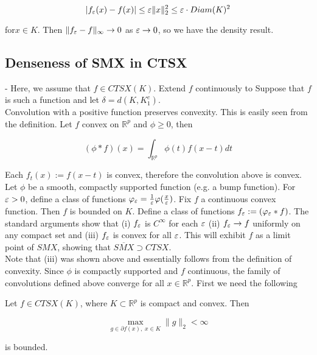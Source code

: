 \documentclass[11pt,reqno]{amsart}
\numberwithin{equation}{section}
\newcommand{\mr}{\mathbb{R}}
\newcommand{\pa}{\partial}
\begin{document}
\[
|f_{\varepsilon}(x) - f(x)| \leq \varepsilon \|x\|_2^2 \leq \varepsilon \cdot Diam(K)^2
\]

for$x \in K$. Then $\|f_{\varepsilon} - f\|_{\infty} \rightarrow 0$ as $\varepsilon \rightarrow 0$, so we have the density result. 

\subsection{Denseness of SMX in CTSX} - Here, we assume that $f \in CTSX(K)$. Extend $f$ continuously to Suppose that $f$ is such a function and let $\delta = d(K, K_1^c)$. \\

Convolution with a positive function preserves convexity. This is easily seen from the definition. Let $f$ convex on $\mr^p$ and $\phi \geq 0$, then 

\[
(\phi \ast f)(x) = \int_{\mr^p} \phi(t) f(x - t) dt 
\]

Each $f_t(x) := f(x -t)$ is convex, therefore the convolution above is convex. \\

Let $\phi$ be a smooth, compactly supported function (e.g. a bump function). For $\varepsilon > 0$, define a class of functions $\varphi_{\varepsilon} = \frac{1}{\varepsilon} \varphi(\frac{x}{\varepsilon})$. Fix $f$ a continuous convex function. Then $f$ is bounded on $K$. Define a class of functions $f_{\varepsilon} := (\varphi_{\varepsilon} \ast f)$. The standard arguments show that (i) $f_{\varepsilon}$ is $C^{\infty}$ for each $\varepsilon$ (ii) $f_{\varepsilon} \rightarrow f$ uniformly on any compact set and (iii) $f_{\varepsilon}$ is convex for all $\varepsilon$. This will exhibit $f$ as a limit point of $SMX$, showing that $\overline{SMX} \supset CTSX$. \\

Note that (iii) was shown above and essentially follows from the definition of convexity. Since $\phi$ is compactly supported and $f$ continuous, the family of convolutions defined above converge for all $x \in \mr^p$. First we need the following 

\begin{lemma} \label{cts-convex-grad} 
Let $f \in CTSX(K)$, where $K \subset \mr^p$ is compact and convex. Then

\begin{equation} \label{grad-set}
\underset{g \in \pa f(x), \; x \in K}{ \max} \|g\|_2  < \infty 
\end{equation}

is bounded. 
\end{lemma}
\end{document}
